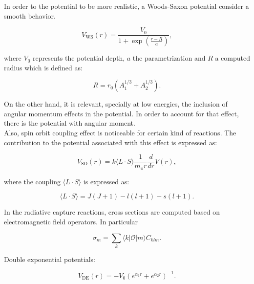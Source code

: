 \documentclass[openany]{book}
\begin{document}
In order to the potential to be more realistic, a Woods-Saxon potential consider a smooth behavior.

\begin{equation} \label{eq:potential_WoodsSaxon}
	V_{\mathrm{WS}}(r) = \frac{V_0}{1 + \exp  \left({\frac{r-R}{a}}\right)},
\end{equation}

where $V_0$ represents the potential depth, $a$ the parametrization and $R$ a computed radius which is defined as: 

\begin{equation} \label{eq:potential_WoodsSaxon_radius}
	R = r_0(A_1^{1/3} + A_2^{1/3}).
\end{equation}

On the other hand, it is relevant, specially at low energies, the inclusion of angular momentum effects in the potential. In order to account for that effect, there is the potential with angular moment. \\

Also, spin orbit coupling effect is noticeable for certain kind of reactions. The contribution to the potential associated with this effect is expressed as:

\begin{equation}  \label{eq:potential_spinOrbit}
	V_{\mathrm{SO}}(r) = k\langle L \cdot S \rangle  \frac{1}{m_{\pi}r} \frac{d}{dr} V(r),
\end{equation}

where the coupling  $  \langle L \cdot S \rangle$ is expressed as: 

\begin{equation}  \label{eq:potential_spinOrbit_LSexpansion}
	\langle L \cdot S \rangle = J(J+1) - l(l+1) - s(l+1).
\end{equation}

In the radiative capture reactions, cross sections are computed based on electromagnetic field operators. In particular 

\begin{equation}  \label{eq:radiativeCapture_operator}
	\sigma_m = \sum_{k}{\langle k | \mathcal{O} | m \rangle} C_{klm}.		
\end{equation}

Double exponential potentials: 

\begin{equation} \label{eq:potential_doubleExponential}
	V_{\mathrm{DE}}(r) = - V_0 \left(e^{\alpha_1 r} + e^{\alpha_2 r} \right)^{-1}.
\end{equation}
\end{document}

